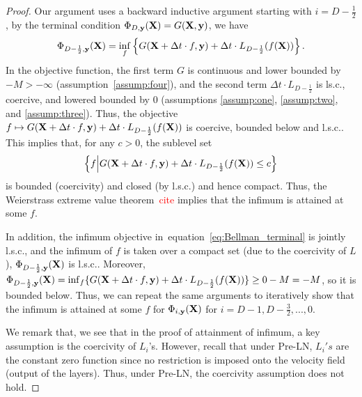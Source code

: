 \documentclass[10pt,a4paper]{amsart}
\newcommand{\bfX}{{\bf X}}
\newcommand{\bfy}{ {\bf y}}
\def\eqref#1{equation~\ref{#1}}
\newcommand{\tr}[1]{\textcolor{red}{#1}}
\begin{document}
\begin{proof}
    Our argument uses a backward inductive argument starting with $i=D-\frac{1}{2}$, by the terminal condition $\Phi_{D, \bfy}(\bfX) = G(\bfX, \bfy)$, we have
    \begin{equation}\label{eq:Bellman_terminal}
    {\Phi}_{D-\frac{1}{2}, \bfy}(\bfX) = \inf_{f} \left\{ G(\bfX + \Delta t \cdot f, \bfy) + \Delta t \cdot L_{D-\frac{1}{2}}(f(\bfX)) \right\}.
    \end{equation}
    In the objective function, the first term $G$ is continuous and lower bounded by $-M>-\infty$ (assumption~\ref{assump:four}), and the second term $\Delta t \cdot L_{D-\frac{1}{2}}$ is ls.c., coercive, and lowered bounded by 0 (assumptions \ref{assump:one}, \ref{assump:two}, and \ref{assump:three}). Thus, the objective $ f \mapsto G(\bfX + \Delta t \cdot f, \bfy) + \Delta t \cdot L_{D-\frac{1}{2}}(f(\bfX))$ is coercive, bounded below and l.s.c.. This implies that, for any $c>0$, the sublevel set 
    \[
    \left\{ f\middle| G(\bfX + \Delta t \cdot f, \bfy) + \Delta t \cdot L_{D-\frac{1}{2}}(f(\bfX)) \leq c \right\}
    \]
    is bounded (coercivity) and closed (by l.s.c.) and hence compact. Thus, the Weierstrass extreme value theorem~\tr{cite} implies that the infimum is attained at some $f$. 

    In addition, the infimum objective in~\eqref{eq:Bellman_terminal} is jointly l.s.c., and the infimum of $f$ is taken over a compact set (due to the coercivity of $L$), ${\Phi}_{D-\frac{1}{2}, \bfy}(\bfX)$ is l.s.c.. Moreover, ${\Phi}_{D-\frac{1}{2}, \bfy}(\bfX) = \inf_{f} \{ G(\bfX + \Delta t \cdot f, \bfy) + \Delta t \cdot L_{D-\frac{1}{2}}(f(\bfX)) \} \geq 0-M=-M$, so it is bounded below. Thus, we can repeat the same arguments to iteratively show that the infimum is attained at some $f$ for ${\Phi}_{i, \bfy}(\bfX) $ for $i=D-1, D-\frac{3}{2},...,0$. 

    We remark that, we see that in the proof of attainment of infimum, a key assumption is the coercivity of $L_i$'s. However, recall that under Pre-LN, $L_i's$ are the constant zero function since no restriction is imposed onto the velocity field (output of the layers). Thus, under Pre-LN, the coercivity assumption does not hold.


\end{proof}
\end{document}
